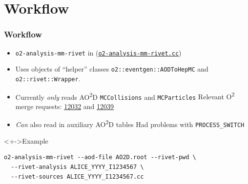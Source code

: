 \documentclass[compress,table,8pt]{beamer}
\newcommand\Otwo{O\textsuperscript{2}}
\newcommand\AOD{AO\textsuperscript{2}D}
\begin{document}
\section{Workflow}
\begin{frame}[fragile]
  \frametitle{Workflow}

  \begin{itemize}
  \item<+-> \texttt{o2-analysis-mm-rivet} in
    (\href{https://gitlab.com/cholmcc/O2Rivet/-/blob/master/o2-analysis-mm-rivet.cc}{\texttt{o2-analysis-mm-rivet.cc}})
  \item<+-> Uses objects of ``helper'' classes
    \texttt{o2::eventgen::AODToHepMC} and \texttt{o2::rivet::Wrapper}.
  \item<+-> Currently \emph{only} reads \AOD{} \texttt{MCCollisions}
    and \texttt{MCParticles}\newline
    {\footnotesize Relevant \Otwo{} merge requests:
      \href{https://github.com/AliceO2Group/AliceO2/pull/12032}{12032}
      and
      \href{https://github.com/AliceO2Group/AliceO2/pull/12039}{12039}
    }
  \item<+-> \emph{Can} also read in auxiliary \AOD{} tables\newline
    {\footnotesize Had problems with \texttt{PROCESS\_SWITCH}}
  \end{itemize}

  \begin{exampleblock}<+->{Example}
\begin{verbatim}
o2-analysis-mm-rivet --aod-file AO2D.root --rivet-pwd \
  --rivet-analysis ALICE_YYYY_I1234567 \
  --rivet-sources ALICE_YYYY_I1234567.cc
\end{verbatim}
  \end{exampleblock}
\end{frame}
\end{document}
